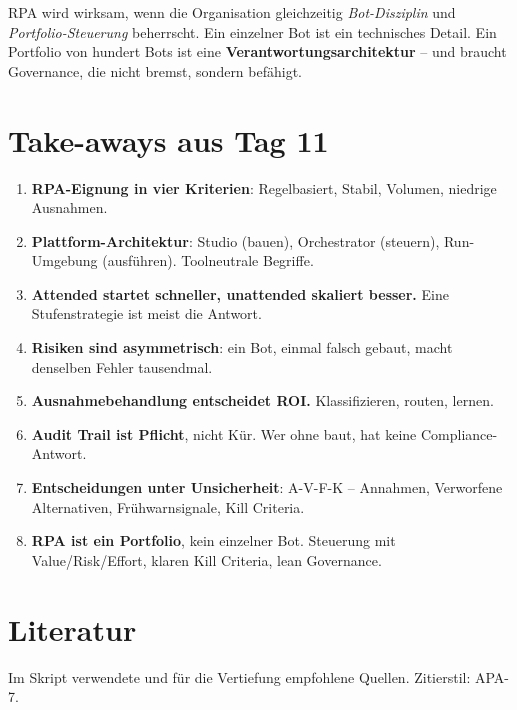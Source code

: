 \documentclass[11pt,a4paper,oneside]{article}
\begin{document}
\begin{merkbox}
RPA wird wirksam, wenn die Organisation gleichzeitig \emph{Bot-Disziplin} und \emph{Portfolio-Steuerung} beherrscht. Ein einzelner Bot ist ein technisches Detail. Ein Portfolio von hundert Bots ist eine \textbf{Verantwortungsarchitektur} -- und braucht Governance, die nicht bremst, sondern befähigt.
\end{merkbox}

\section{Take-aways aus Tag 11}

\begin{enumerate}
  \item \textbf{RPA-Eignung in vier Kriterien}: Regelbasiert, Stabil, Volumen, niedrige Ausnahmen.
  \item \textbf{Plattform-Architektur}: Studio (bauen), Orchestrator (steuern), Run-Umgebung (ausführen). Toolneutrale Begriffe.
  \item \textbf{Attended startet schneller, unattended skaliert besser.} Eine Stufenstrategie ist meist die Antwort.
  \item \textbf{Risiken sind asymmetrisch}: ein Bot, einmal falsch gebaut, macht denselben Fehler tausendmal.
  \item \textbf{Ausnahmebehandlung entscheidet ROI.} Klassifizieren, routen, lernen.
  \item \textbf{Audit Trail ist Pflicht}, nicht Kür. Wer ohne baut, hat keine Compliance-Antwort.
  \item \textbf{Entscheidungen unter Unsicherheit}: A-V-F-K -- Annahmen, Verworfene Alternativen, Frühwarnsignale, Kill Criteria.
  \item \textbf{RPA ist ein Portfolio}, kein einzelner Bot. Steuerung mit Value/Risk/Effort, klaren Kill Criteria, lean Governance.
\end{enumerate}

\clearpage
\section{Literatur}

Im Skript verwendete und für die Vertiefung empfohlene Quellen. Zitierstil: APA-7.
\end{document}
